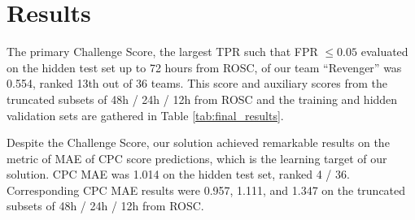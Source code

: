 \section{Results}
\label{sec:results}



% 


The primary Challenge Score, the largest TPR such that FPR $\le 0.05$ evaluated on the hidden test set up to 72 hours from ROSC, of our team ``Revenger'' was 0.554, ranked 13th out of 36 teams. This score and auxiliary scores from the truncated subsets of 48h / 24h / 12h from ROSC and the training and hidden validation sets are gathered in Table \ref{tab:final_results}.




 Despite the Challenge Score, our solution achieved remarkable results on the metric of MAE of CPC score predictions, which is the learning target of our solution. CPC MAE was 1.014 on the hidden test set, ranked 4 / 36. Corresponding CPC MAE results were 0.957, 1.111, and 1.347 on the truncated subsets of 48h / 24h / 12h from ROSC.
